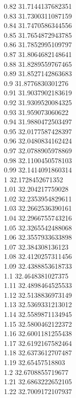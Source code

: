 {0.82	31.7144137682351\\
0.83	31.7300311087159\\
0.84	31.7470586344556\\
0.85	31.7654872943785\\
0.86	31.7852995109797\\
0.87	31.8064682148641\\
0.88	31.8289559767465\\
0.89	31.8527142863683\\
0.9	31.8776830301276\\
0.91	31.9037902183619\\
0.92	31.9309520084325\\
0.93	31.959073060622\\
0.94	31.9880472503497\\
0.95	32.0177587428397\\
0.96	32.0480834162424\\
0.97	32.0788905978869\\
0.98	32.1100450578103\\
0.99	32.1414091860314\\
1	32.1728452671352\\
1.01	32.204217759028\\
1.02	32.2353954829611\\
1.03	32.2662536390161\\
1.04	32.2966755743216\\
1.05	32.3265542488068\\
1.06	32.3557933633898\\
1.07	32.384308136123\\
1.08	32.4120257311456\\
1.09	32.4388853618733\\
1.1	32.4648381027375\\
1.11	32.4898464525533\\
1.12	32.5138836973149\\
1.13	32.5369331213012\\
1.14	32.5589871134945\\
1.15	32.5800462122372\\
1.16	32.6001181255438\\
1.17	32.6192167582464\\
1.18	32.6373612707487\\
1.19	32.65457518803\\
1.2	32.6708855719677\\
1.21	32.6863222652105\\
1.22	32.7009172107937\\
}
